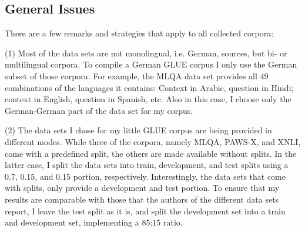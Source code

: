 
\subsection{General Issues}

There are a few remarks and strategies that apply to all collected corpora:

(1) Most of the data sets are not monolingual, i.e. German, sources, but bi- or multilingual
corpora.
To compile a German GLUE corpus I only use the German subset of those corpora.
For example, the MLQA data set provides all 49 combinations of the languages it contains:
Context in Arabic, question in Hindi; context in English, question in Spanish, etc.
Also in this case, I choose only the German-German part of the data set for my corpus.

(2) The data sets I chose for my little GLUE corpus are being provided in different modes.
While three of the corpora, namely MLQA, PAWS-X, and XNLI, come with a predefined split, the
others are made available without splits.
In the latter case, I split the data sets into train, development, and test splits using a 0.7,
0.15, and 0.15 portion, respectively.
Interestingly, the data sets that come with splits, only provide a development and test portion.
To ensure that my results are comparable with those that the authors of the different data sets
report, I leave the test split as it is, and split the development set into a train and
development set, implementing a 85:15 ratio.

